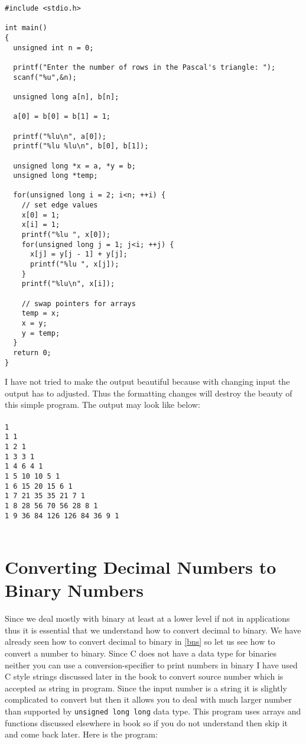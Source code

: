 \begin{verbatim}
#include <stdio.h>
 
int main()
{
  unsigned int n = 0;
 
  printf("Enter the number of rows in the Pascal's triangle: ");
  scanf("%u",&n);
 
  unsigned long a[n], b[n];
  
  a[0] = b[0] = b[1] = 1;

  printf("%lu\n", a[0]);
  printf("%lu %lu\n", b[0], b[1]);

  unsigned long *x = a, *y = b;
  unsigned long *temp;
  
  for(unsigned long i = 2; i<n; ++i) {
    // set edge values
    x[0] = 1;
    x[i] = 1;
    printf("%lu ", x[0]);
    for(unsigned long j = 1; j<i; ++j) {
      x[j] = y[j - 1] + y[j];
      printf("%lu ", x[j]);
    }
    printf("%lu\n", x[i]);

    // swap pointers for arrays
    temp = x;
    x = y;
    y = temp;
  }
  return 0;
}
\end{verbatim}
I have not tried to make the output beautiful because with changing input the
output has to adjusted. Thus the formatting changes will destroy the beauty of
this simple program. The output may look like below:
\\\\\texttt{1\\
1 1\\
1 2 1\\
1 3 3 1\\
1 4 6 4 1\\
1 5 10 10 5 1\\
1 6 15 20 15 6 1\\
1 7 21 35 35 21 7 1\\
1 8 28 56 70 56 28 8 1\\
1 9 36 84 126 126 84 36 9 1\\\\}

\section{Converting Decimal Numbers to Binary Numbers}
Since we deal mostly with binary at least at a lower level if not in
applications thus it is essential that we understand how to convert decimal to
binary. We have already seen how to convert decimal to binary in
\autoref{bns}  so
let us see how to convert a number to binary. Since C does not have a data type
for binaries neither you can use a conversion-specifier to print numbers in
binary I have used C style strings discussed later in the book to convert
source number which is accepted as string in program. Since the input number is
a string it is slightly complicated to convert but then it allows you to deal
with much larger number than supported by \texttt{unsigned long long} data
type. This program uses arrays and functions discussed elsewhere in book so if
you do not understand then skip it and come back later. Here is the program:

